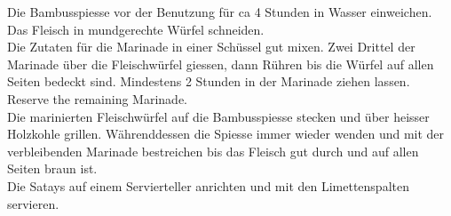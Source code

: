 \vspace*{\fill}
\begin{multicols}{2}

Die Bambusspiesse vor der Benutzung für ca 4 Stunden in Wasser einweichen.\\

Das Fleisch in mundgerechte Würfel schneiden. \\
Die Zutaten für die Marinade in einer Schüssel gut mixen.
Zwei Drittel der Marinade über die Fleischwürfel giessen, dann Rühren bis die Würfel auf allen Seiten bedeckt sind.
Mindestens 2 Stunden in der Marinade ziehen lassen.
Reserve the remaining Marinade.\\
Die marinierten Fleischwürfel auf die Bambusspiesse stecken und über heisser Holzkohle grillen.
Währenddessen die Spiesse immer wieder wenden und mit der verbleibenden Marinade bestreichen bis 
das Fleisch gut durch und auf allen Seiten braun ist.\\

Die Satays auf einem Servierteller anrichten und mit den Limettenspalten servieren.




\end{multicols}
\vfill
